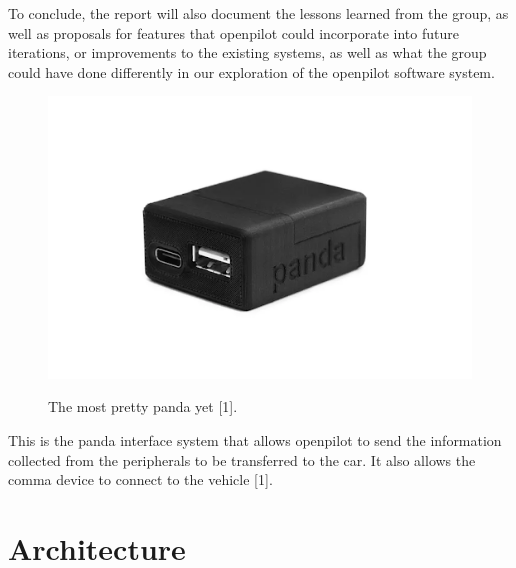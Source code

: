 \documentclass[12pt]{article}
\begin{document}
To conclude, the report will also document the lessons learned from the group, as well as proposals for features that openpilot could incorporate into future iterations, or improvements to the existing systems, as well as what the group could have done differently in our exploration of the openpilot software system.
\begin{figure}[ht]
    \centering
    \includegraphics[scale=0.5]{Assets/panda.png}\\
    \caption{The most pretty panda yet [1].}
    \label{fig:enter-label}
\end{figure}
This is the panda interface system that allows openpilot to send the information collected from the peripherals to be transferred to the car. It also allows the comma device to connect to the vehicle [1].




\section{Architecture}
\end{document}

